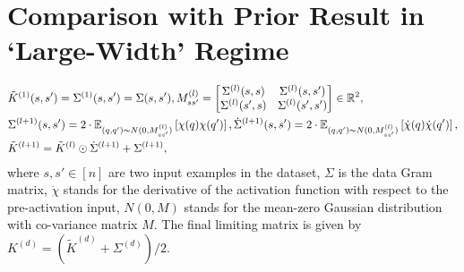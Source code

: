 \section{Comparison with Prior Result in `Large-Width' Regime}\label{sec:exact}
\begin{align}\label{eq:ntkold}
&\tilde{K}^{(1)}(s,s')=\Sigma^{(1)}(s,s')=\Sigma(s,s'), M^{(l)}_{ss'}=\left[\begin{matrix}\Sigma^{(l)}(s,s) & \Sigma^{(l)}(s,s')\\ \Sigma^{(l)}(s',s) & \Sigma^{(l)}(s',s')\end{matrix}\right]\in \mathbb{R}^2,\\
&\Sigma^{(l+1)}(s,s')= 2\cdot\mathbb{E}_{(q,q')\sim N(0,M_{ss'}^{(l)})} \left[\chi(q)\chi(q')\right], \dot{\Sigma}^{(l+1)}(s,s')= 2\cdot\mathbb{E}_{(q,q')\sim N(0,M_{ss'}^{(l)})}\left[\dot{\chi}(q)\dot{\chi}(q')\right],\nonumber\\
&\tilde{K}^{(l+1)}=\tilde{K}^{(l)}\odot \dot{\Sigma}^{(l+1)}+\Sigma^{(l+1)},\nonumber
\end{align}
where $s,s'\in[n]$ are two input examples in the dataset, $\Sigma$ is the data Gram matrix, $\dot{\chi}$ stands for the derivative of the activation function with respect to the pre-activation input, $N(0,M)$ stands for the mean-zero Gaussian distribution with co-variance matrix $M$. The final limiting matrix is given by $K^{(d)}=\left(\tilde{K}^{(d)}+\Sigma^{(d)}\right)/2$. 
